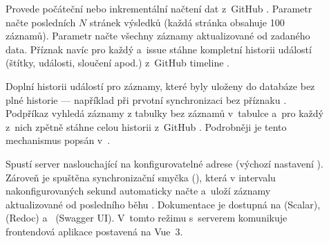 \begin{description}
  \item[]
    Provede počáteční nebo inkrementální načtení dat z~GitHub \API. Parametr  načte posledních $N$ stránek výsledků (každá stránka obsahuje 100 záznamů). Parametr  načte všechny záznamy aktualizované od zadaného data. Příznak  navíc pro každý \PR a~issue stáhne kompletní historii událostí (štítky, události, sloučení apod.) z~GitHub timeline \API.

  \item[]
    Doplní historii událostí pro záznamy, které byly uloženy do databáze bez plné historie — například při prvotní synchronizaci bez příznaku . Podpříkaz vyhledá záznamy z tabulky  bez záznamů v~tabulce  a~pro každý z~nich zpětně stáhne celou historii z~GitHub \API. Podrobněji je tento mechanismus popsán v~.

  \item[]
    Spustí \REST \API server naslouchající na konfigurovatelné adrese (výchozí nastavení ). Zároveň je spuštěna synchronizační smyčka (), která v intervalu nakonfigurovaných sekund automaticky načte a~uloží záznamy aktualizované od posledního běhu . Dokumentace \API je dostupná na \URL {} (Scalar),  (Redoc) a~ (Swagger UI). V~tomto režimu s~\API serverem komunikuje frontendová \SPA aplikace postavená na Vue~3.
\end{description}
